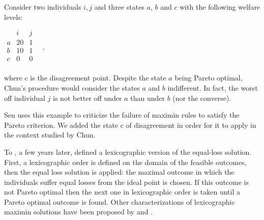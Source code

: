 \begin{example}\label{ex:sen}
	Consider two individuals $i,j$ and three states $a$, $b$ and $c$ with the following welfare levels:
	
	\begin{center}
		$
		\begin{array}{ccc}
			& i & j \\
			a &	20 & 1 \\
			b &	10 & 1 \\
			c & 0 & 0 \\
		\end{array} \quad, 
		$
	\end{center}
	where c is the disagreement point.
	Despite the state $a$ being Pareto optimal, Chun's procedure would consider the states $a$ and $b$ indifferent. In fact, the worst off individual $j$ is not better off under $a$ than under $b$ (nor the converse).
\end{example}

Sen uses this example to criticize the failure of maximin rules to satisfy the Pareto criterion. We added the state c of disagreement in order for it to apply in the context studied by Chun.
 
To , a few years later, \citet{Chun1991} defined a lexicographic version of the equal-loss solution. 
First, a lexicographic order is defined on the domain of the feasible outcomes, then the equal loss solution is applied: the maximal outcome in which the individuals suffer equal losses from the ideal point is chosen. If this outcome is not Pareto optimal then the next one in lexicographic order is taken until a Pareto optimal outcome is found. Other characterizations of lexicographic maximin solutions have been proposed by \citet{Sen2017} and \citet{Chang1999}.

